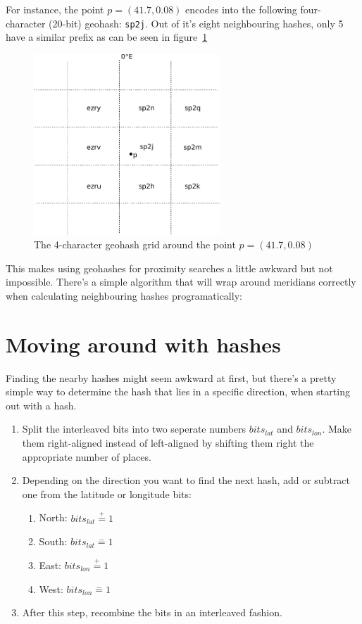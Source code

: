 \documentclass[a4paper,11pt,oneside]{scrartcl}
\begin{document}
For instance, the point $p = (41.7, 0.08)$ encodes into the following four-character (20-bit) geohash: \texttt{sp2j}.
Out of it's eight neighbouring hashes, only 5 have a similar prefix as can be seen in figure~\ref{fig:4-grid}

\begin{figure}[t]
	\centering
	\includegraphics[width=7cm]{graphics/grid_meridian.pdf}
	\caption{The 4-character geohash grid around the point $p = (41.7, 0.08)$}
	\label{fig:4-grid}
\end{figure}

This makes using geohashes for proximity searches a little awkward but not impossible. There's a simple algorithm that will wrap around meridians correctly when calculating neighbouring hashes programatically:

\section{Moving around with hashes} %
\label{sec:Moving around with hashes}

Finding the nearby hashes might seem awkward at first, but there's a pretty simple way to determine the hash that lies in a specific direction, when starting out with a hash.

\begin{enumerate}
  \item Split the interleaved bits into two seperate numbers $bits_{lat}$ and $bits_{lon}$. Make them right-aligned instead of left-aligned by shifting them right the appropriate number of places.
  \item Depending on the direction you want to find the next hash, add or subtract one from the latitude or longitude bits:
  \begin{enumerate}
    \item North: $bits_{lat} \stackrel{+}{=} 1$
    \item South: $bits_{lat} \stackrel{-}{=} 1$
    \item East: $bits_{lon} \stackrel{+}{=} 1$
    \item West: $bits_{lon} \stackrel{-}{=} 1$
  \end{enumerate}
  \item After this step, recombine the bits in an interleaved fashion.
\end{enumerate}
\end{document}
